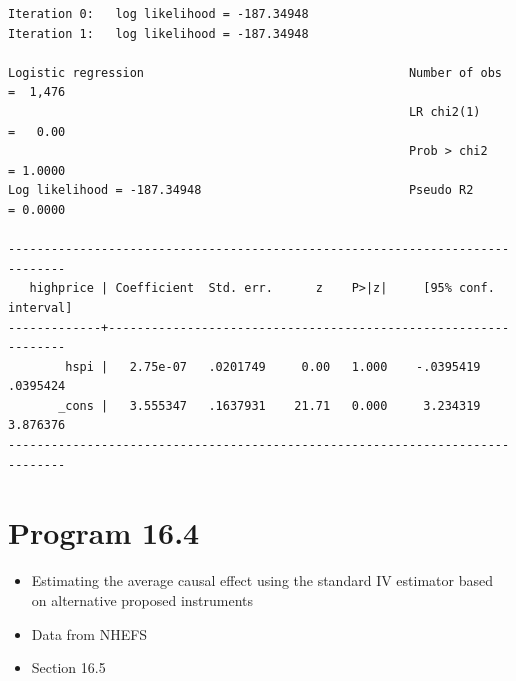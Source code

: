 \documentclass[
  10pt,
  a4paper,
]{book}
\providecommand{\tightlist}{%
  \setlength{\itemsep}{0pt}\setlength{\parskip}{0pt}}
\begin{document}
\begin{verbatim}
Iteration 0:   log likelihood = -187.34948  
Iteration 1:   log likelihood = -187.34948  

Logistic regression                                     Number of obs =  1,476
                                                        LR chi2(1)    =   0.00
                                                        Prob > chi2   = 1.0000
Log likelihood = -187.34948                             Pseudo R2     = 0.0000

------------------------------------------------------------------------------
   highprice | Coefficient  Std. err.      z    P>|z|     [95% conf. interval]
-------------+----------------------------------------------------------------
        hspi |   2.75e-07   .0201749     0.00   1.000    -.0395419    .0395424
       _cons |   3.555347   .1637931    21.71   0.000     3.234319    3.876376
------------------------------------------------------------------------------
\end{verbatim}

\hypertarget{program-16.4-1}{%
\section{Program 16.4}\label{program-16.4-1}}

\begin{itemize}
\tightlist
\item
  Estimating the average causal effect using the standard IV estimator based on alternative proposed instruments
\item
  Data from NHEFS
\item
  Section 16.5
\end{itemize}
\end{document}
